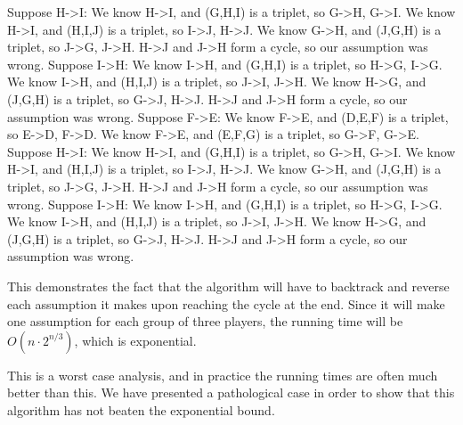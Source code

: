 \documentclass[12pt]{article}
\begin{document}
\begin{verbatimtab}
        Suppose H->I:
            We know H->I, and (G,H,I) is a triplet, so G->H, G->I.
            We know H->I, and (H,I,J) is a triplet, so I->J, H->J.
            We know G->H, and (J,G,H) is a triplet, so J->G, J->H.
            H->J and J->H form a cycle, so our assumption was wrong.
        Suppose I->H:
            We know I->H, and (G,H,I) is a triplet, so H->G, I->G.
            We know I->H, and (H,I,J) is a triplet, so J->I, J->H.
            We know H->G, and (J,G,H) is a triplet, so G->J, H->J.
            H->J and J->H form a cycle, so our assumption was wrong.
    Suppose F->E:
        We know F->E, and (D,E,F) is a triplet, so E->D, F->D.
        We know F->E, and (E,F,G) is a triplet, so G->F, G->E.
        Suppose H->I:
            We know H->I, and (G,H,I) is a triplet, so G->H, G->I.
            We know H->I, and (H,I,J) is a triplet, so I->J, H->J.
            We know G->H, and (J,G,H) is a triplet, so J->G, J->H.
            H->J and J->H form a cycle, so our assumption was wrong.
        Suppose I->H:
            We know I->H, and (G,H,I) is a triplet, so H->G, I->G.
            We know I->H, and (H,I,J) is a triplet, so J->I, J->H.
            We know H->G, and (J,G,H) is a triplet, so G->J, H->J.
            H->J and J->H form a cycle, so our assumption was wrong.
    \end{verbatimtab}

    This demonstrates the fact that the algorithm will have to backtrack and reverse each assumption it makes upon reaching the cycle at the end. Since it will make one assumption for each group of three players, the running time will be $O(n \cdot 2^{n/3})$, which is exponential. 

    This is a worst case analysis, and in practice the running times are often much better than this. We have presented a pathological case in order to show that this algorithm has not beaten the exponential bound.

\begin{comment}
\section{Overview: Steiner Triple Systems}
    Definition, examples
    discuss how the number of pairs dominates the number of players
    (this defeats our heuristic)
    A slightly better algorithm could `outsmart' our trap from the previous section, but the existence of Steiner Triple Systems shows that we can have so few repeated pairs as to render the heuristic useless. STS shows that this is a systemic problem. 
\end{comment}
\end{document}
